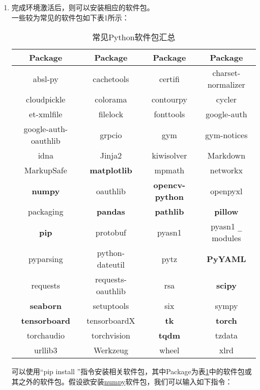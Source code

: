 \documentclass{article}
\begin{document}
\begin{enumerate}
				\item 完成环境激活后，则可以安装相应的软件包。\\
				一些较为常见的软件包如下表1所示：
				\begin{table}[H]
					\centering
					\caption{常见Python软件包汇总}
					\setlength{\tabcolsep}{15pt}
					\begin{tabular}{@{}c|c|c|c@{}}
						\toprule
							\textbf{Package} & \textbf{Package} & \textbf{Package} & \textbf{Package} \\
						\midrule
							absl-py & cachetools & certifi & charset-normalizer \\
							cloudpickle & colorama & contourpy & cycler \\
							et-xmlfile & filelock & fonttools & google-auth \\
							google-auth-oauthlib & grpcio & gym & gym-notices \\
							idna & Jinja2 & kiwisolver & Markdown \\
							MarkupSafe & \textbf{matplotlib} & mpmath & networkx \\
							\textbf{numpy} & oauthlib & \textbf{opencv-python} & openpyxl \\
							packaging & \textbf{pandas} & \textbf{pathlib} & \textbf{pillow} \\
							\textbf{pip} & protobuf & pyasn1 & pyasn1 \verb*|_| modules \\
							pyparsing & python-dateutil & pytz & \textbf{PyYAML} \\
							requests & requests-oauthlib & rsa & \textbf{scipy} \\
							\textbf{seaborn} & setuptools & six & sympy \\
							\textbf{tensorboard} & tensorboardX & \textbf{tk} & \textbf{torch} \\
							torchaudio & torchvision & \textbf{tqdm} & tzdata \\
							urllib3 & Werkzeug & wheel & xlrd \\
						\bottomrule
					\end{tabular}
					\label{table1}
				\end{table}
				可以使用“pip install ”指令安装相关软件包，其中Package为表\ref{table1}中的软件包或其之外的软件包。假设欲安装\underline{numpy}软件包，我们可以输入如下指令：\\
		

\end{enumerate}
\end{document}
